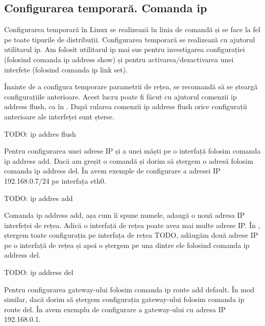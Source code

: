 \subsection{Configurarea temporară. Comanda ip}
\label{sec:net:temporary-config}

Configurarea temporară în Linux se realizează în linia de comandă și se face la fel pe toate tipurile de distribuții. Configurarea temporară se realizează cu ajutorul utilitarul ip. Am folosit utilitarul ip mai sus pentru investigarea configurației (folosind comanda ip address show) și pentru activarea/dezactivarea unei interfețe (folosind comanda ip link set).

Înainte de a configura temporare parametrii de rețea, se recomandă să se șteargă configurațiile anterioare. Acest lucru poate fi făcut cu ajutorul comenzii ip address flush, ca în . După rularea comenzii ip address flush orice configurații anterioare ale interfeței sunt șterse.

\begin{screen}[caption={Ștergerea configurațiilor unei interfețe},label={lst:net:flush-if}]
TODO: ip addres flush
\end{screen}

Pentru configurarea unei adrese IP și a unei măști pe o interfață folosim comanda ip address add. Dacă am greșit o comandă și dorim să ștergem o adresă folosim comanda ip address del. În  avem exemple de configurare a adresei IP 192.168.0.7/24 pe interfața eth0.

\begin{screen}[caption={Configurarea unei adrese pe o interfață},label={lst:net:add-ip}]
TODO: ip addres add
\end{screen}

Comanda ip address add, așa cum îi spune numele, adaugă o nouă adresa IP interfeței de rețea. Adică o interfață de rețea poate avea mai multe adrese IP. În , ștergem toate configurația pe interfața de rețea TODO, adăugăm două adrese IP pe o interfață de rețea și apoi o ștergem pe una dintre ele folosind comanda ip address del.

\begin{screen}[caption={Ștergerea unei adrese de pe o interfață},label={lst:net:del-ip}]
TODO: ip address del
\end{screen}

Pentru configurarea gateway-ului folosim comanda ip route add default. În mod similar, dacă dorim să ștergem configurația gateway-ului folosim comanda ip route del. În  avem exemplu de configurare a gateway-ului cu adresa IP 192.168.0.1.

